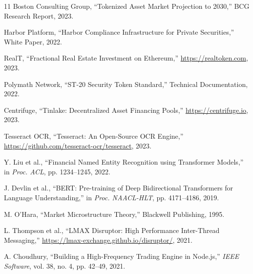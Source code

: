 \documentclass[conference]{IEEEtran}
\begin{document}
\begin{thebibliography}{11}
Boston Consulting Group, ``Tokenized Asset Market Projection to 2030,'' BCG Research Report, 2023.

Harbor Platform, ``Harbor Compliance Infrastructure for Private Securities,'' White Paper, 2022.

RealT, ``Fractional Real Estate Investment on Ethereum,'' \url{https://realtoken.com}, 2023.

Polymath Network, ``ST-20 Security Token Standard,'' Technical Documentation, 2022.

Centrifuge, ``Tinlake: Decentralized Asset Financing Pools,'' \url{https://centrifuge.io}, 2023.

Tesseract OCR, ``Tesseract: An Open-Source OCR Engine,'' \url{https://github.com/tesseract-ocr/tesseract}, 2023.

Y. Liu et al., ``Financial Named Entity Recognition using Transformer Models,'' in \textit{Proc. ACL}, pp. 1234--1245, 2022.

J. Devlin et al., ``BERT: Pre-training of Deep Bidirectional Transformers for Language Understanding,'' in \textit{Proc. NAACL-HLT}, pp. 4171--4186, 2019.

M. O'Hara, ``Market Microstructure Theory,'' Blackwell Publishing, 1995.

L. Thompson et al., ``LMAX Disruptor: High Performance Inter-Thread Messaging,'' \url{https://lmax-exchange.github.io/disruptor/}, 2021.

A. Choudhury, ``Building a High-Frequency Trading Engine in Node.js,'' \textit{IEEE Software}, vol. 38, no. 4, pp. 42--49, 2021.
\end{thebibliography}
\end{document}
